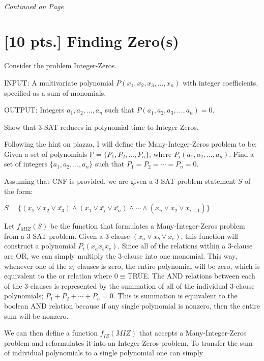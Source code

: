 \documentclass[11pt]{article}
\begin{document}
\paragraph{} \emph{Continued on Page \pageref{pg:p2-continuation}}

\newpage

\section{[10 pts.] Finding Zero(s)} 

Consider the problem Integer-Zeros. 

INPUT: A multivariate polynomial $P(x_1,x_2,x_3,\ldots,x_n)$ with integer
coefficients, specified as a sum of monomials. 

OUTPUT: Integers $a_1,a_2,\ldots,a_n$ such that $P(a_1,a_2,a_3,\ldots,a_n)=0$.

Show that 3-SAT reduces in polynomial time to Integer-Zeros. 

\bigskip
  
Following the hint on piazza, I will define the Many-Integer-Zeros problem 
to be: Given a set of polynomials $\mathbb{P} = \{P_1,P_2,\ldots,P_n\}$, where
$P_i(a_1,a_2,\ldots,a_n)$. 
Find a set of integers $\{a_1,a_2,\ldots,a_n\}$ such that $P_1=P_2=\cdots=P_n=0$.

Assuming that CNF is provided, we are given a 3-SAT problem statement $S$
of the form: 

$S = \{(x_1 \vee x_2 \vee \bar{x_3})
\wedge (x_1 \vee \bar{x_i} \vee \bar{x_n})
\wedge \cdots
\wedge (x_n \vee x_2 \vee x_{i+1})\}$

Let $f_{MIZ}(S)$ be the function that formulates a Many-Integer-Zeros problem 
from a 3-SAT problem. Given a 3-clause $(x_a \vee x_b \vee x_c)$, 
this function will construct
a polynomial $P_i(x_ax_bx_c)$. 
Since all of the relations within a 3-clause are OR, 
we can simply multiply the 3-clause into one monomial. This way, whenever one of the
$x_i$ clauses is zero, the entire polynomial will be zero, which is equivalent to
the or relation where 0$\equiv$TRUE. The AND relations
between each of the 3-clauses is represented by the summation of all of the individual
3-clause polynomials; $P_1+P_2+\cdots+P_n = 0$. This is summation is equivalent to 
the boolean AND relation because if any single polynomial is nonzero, then the 
entire sum will be nonzero.

We can then define a function $f_{IZ}(MIZ)$ that accepts a Many-Integer-Zeros problem
and reformulates it into an Integer-Zeros problem. To transfer the sum of individual polynomials
to a single polynomial one can simply 
\end{document}

